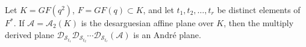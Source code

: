 Let $K = GF(q^2)$, $F = GF(q) \subset K$, and let $t_1, t_2, \dots, t_r$ be distinct elements of $F^*$. If $\mathcal{A} = \mathcal{A}_2(K)$ is the desarguesian affine plane over $K$, then the multiply derived plane $\mathcal{D}_{\mathcal{S}_{t_1}} \mathcal{D}_{\mathcal{S}_{t_2}} \cdots \mathcal{D}_{\mathcal{S}_{t_r}} (\mathcal{A})$ is an André plane.
